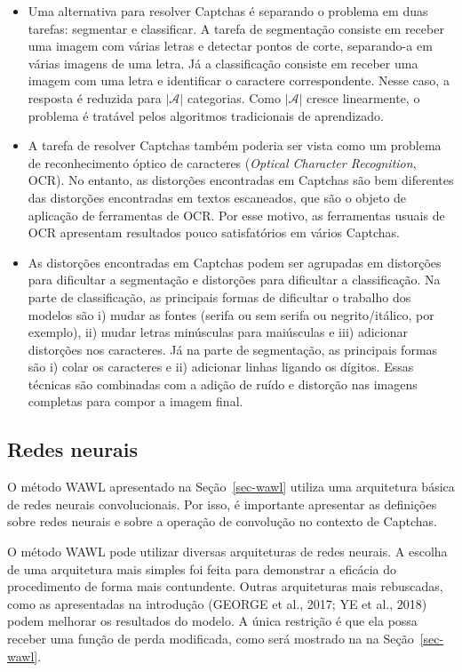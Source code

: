 \documentclass[12pt,twoside,brazilian]{book}
\begin{document}
\begin{itemize}
\item
  Uma alternativa para resolver Captchas é separando o problema em duas
  tarefas: segmentar e classificar. A tarefa de segmentação consiste em
  receber uma imagem com várias letras e detectar pontos de corte,
  separando-a em várias imagens de uma letra. Já a classificação
  consiste em receber uma imagem com uma letra e identificar o caractere
  correspondente. Nesse caso, a resposta é reduzida para
  \(|\mathcal A|\) categorias. Como \(|\mathcal A|\) cresce linearmente,
  o problema é tratável pelos algoritmos tradicionais de aprendizado.
\item
  A tarefa de resolver Captchas também poderia ser vista como um
  problema de reconhecimento óptico de caracteres (\emph{Optical
  Character Recognition}, OCR). No entanto, as distorções encontradas em
  Captchas são bem diferentes das distorções encontradas em textos
  escaneados, que são o objeto de aplicação de ferramentas de OCR. Por
  esse motivo, as ferramentas usuais de OCR apresentam resultados pouco
  satisfatórios em vários Captchas.
\item
  As distorções encontradas em Captchas podem ser agrupadas em
  distorções para dificultar a segmentação e distorções para dificultar
  a classificação. Na parte de classificação, as principais formas de
  dificultar o trabalho dos modelos são i) mudar as fontes (serifa ou
  sem serifa ou negrito/itálico, por exemplo), ii) mudar letras
  minúsculas para maiúsculas e iii) adicionar distorções nos caracteres.
  Já na parte de segmentação, as principais formas são i) colar os
  caracteres e ii) adicionar linhas ligando os dígitos. Essas técnicas
  são combinadas com a adição de ruído e distorção nas imagens completas
  para compor a imagem final.
\end{itemize}

\hypertarget{redes-neurais}{%
\subsection{Redes neurais}\label{redes-neurais}}

O método WAWL apresentado na Seção~\ref{sec-wawl} utiliza uma
arquitetura básica de redes neurais convolucionais. Por isso, é
importante apresentar as definições sobre redes neurais e sobre a
operação de convolução no contexto de Captchas.

O método WAWL pode utilizar diversas arquiteturas de redes neurais. A
escolha de uma arquitetura mais simples foi feita para demonstrar a
eficácia do procedimento de forma mais contundente. Outras arquiteturas
mais rebuscadas, como as apresentadas na introdução (GEORGE et al.,
2017; YE et al., 2018) podem melhorar os resultados do modelo. A única
restrição é que ela possa receber uma função de perda modificada, como
será mostrado na na Seção~\ref{sec-wawl}.
\end{document}
